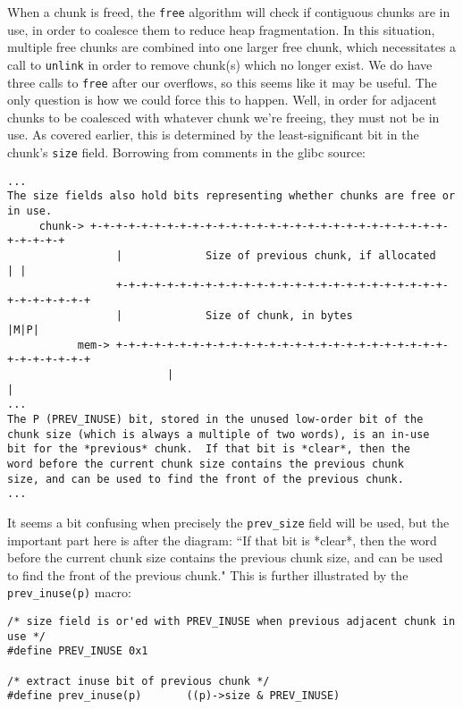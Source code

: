 When a chunk is freed, the \texttt{free} algorithm will check if 
contiguous chunks are in use, in order to coalesce them to reduce 
heap fragmentation. In this situation, multiple free chunks are
combined into one larger free chunk, which necessitates a call
to \texttt{unlink} in order to remove chunk(s) which no longer exist.
We do have three calls to \texttt{free} after our overflows, so this
seems like it may be useful. The only question is how we could force
this to happen. Well, in order for adjacent chunks to be coalesced
with whatever chunk we're freeing, they must not be in use. As covered
earlier, this is determined by the least-significant bit in the chunk's
\texttt{size} field. Borrowing from comments in the glibc source:

\begin{lstlisting}
...
The size fields also hold bits representing whether chunks are free or
in use.
     chunk-> +-+-+-+-+-+-+-+-+-+-+-+-+-+-+-+-+-+-+-+-+-+-+-+-+-+-+-+-+-+-+-+-+
		         |             Size of previous chunk, if allocated            | |
		         +-+-+-+-+-+-+-+-+-+-+-+-+-+-+-+-+-+-+-+-+-+-+-+-+-+-+-+-+-+-+-+-+
		         |             Size of chunk, in bytes                       |M|P|
		   mem-> +-+-+-+-+-+-+-+-+-+-+-+-+-+-+-+-+-+-+-+-+-+-+-+-+-+-+-+-+-+-+-+-+
						 |                                                               |
...
The P (PREV_INUSE) bit, stored in the unused low-order bit of the
chunk size (which is always a multiple of two words), is an in-use
bit for the *previous* chunk.  If that bit is *clear*, then the
word before the current chunk size contains the previous chunk
size, and can be used to find the front of the previous chunk.
...
\end{lstlisting}

It seems a bit confusing when precisely the \texttt{prev\_size} field will be used,
but the important part here is after the diagram: 
``If that bit is *clear*, then the word before the current chunk size contains the previous chunk
size, and can be used to find the front of the previous chunk." This is further illustrated
by the \texttt{prev\_inuse(p)} macro:

\begin{lstlisting}
/* size field is or'ed with PREV_INUSE when previous adjacent chunk in use */
#define PREV_INUSE 0x1

/* extract inuse bit of previous chunk */
#define prev_inuse(p)       ((p)->size & PREV_INUSE)
\end{lstlisting}

